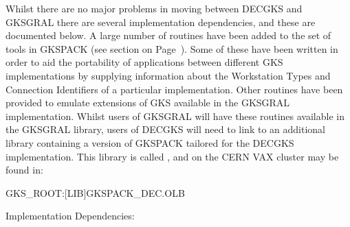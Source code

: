 Whilst there are no major problems in moving between DECGKS and GKSGRAL
there are several implementation dependencies, and these are documented
below. A large number of routines have been added to the set of tools
in GKSPACK (see section on Page~\pageref{sec:gkspref}).
Some of these have been written in order to aid the portability of applications
between different GKS implementations by supplying information
about the Workstation Types and Connection Identifiers of a particular
implementation. Other routines have been provided to emulate extensions of
GKS available in the GKSGRAL implementation. Whilst users of GKSGRAL
will have these routines available in the GKSGRAL library,
users of DECGKS will need to link to an additional library
containing a version of GKSPACK tailored for the DECGKS implementation.
This library is called , and on the CERN VAX cluster
may be found in:
\begin{XMP}
GKS_ROOT:[LIB]GKSPACK_DEC.OLB
\end{XMP}
Implementation Dependencies:
